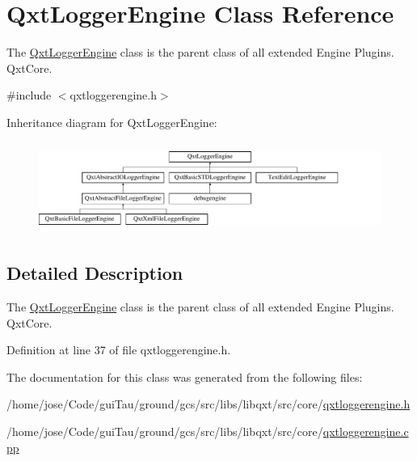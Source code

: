 \hypertarget{class_qxt_logger_engine}{\section{Qxt\-Logger\-Engine Class Reference}
\label{class_qxt_logger_engine}
}


The \hyperlink{class_qxt_logger_engine}{Qxt\-Logger\-Engine} class is the parent class of all extended Engine Plugins.  Qxt\-Core.  




{\ttfamily \#include $<$qxtloggerengine.\-h$>$}

Inheritance diagram for Qxt\-Logger\-Engine\-:\begin{figure}[H]
\begin{center}
\leavevmode
\includegraphics[height=3.010753cm]{class_qxt_logger_engine}
\end{center}
\end{figure}


\subsection{Detailed Description}
The \hyperlink{class_qxt_logger_engine}{Qxt\-Logger\-Engine} class is the parent class of all extended Engine Plugins.  Qxt\-Core. 



Definition at line 37 of file qxtloggerengine.\-h.



The documentation for this class was generated from the following files\-:\begin{DoxyCompactItemize}
\item 
/home/jose/\-Code/gui\-Tau/ground/gcs/src/libs/libqxt/src/core/\hyperlink{qxtloggerengine_8h}{qxtloggerengine.\-h}\item 
/home/jose/\-Code/gui\-Tau/ground/gcs/src/libs/libqxt/src/core/\hyperlink{qxtloggerengine_8cpp}{qxtloggerengine.\-cpp}\end{DoxyCompactItemize}
